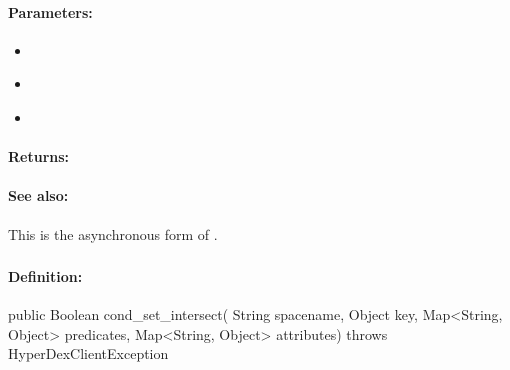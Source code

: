 \paragraph{Parameters:}
\begin{itemize}[noitemsep]
\item {}\\

\item {}\\

\item {}\\

\end{itemize}

\paragraph{Returns:}


\paragraph{See also:}  This is the asynchronous form of .

\pagebreak
\subsubsection{}
\label{api:java:cond_set_intersect}


\paragraph{Definition:}
\begin{javacode}
public Boolean cond_set_intersect(
        String spacename,
        Object key,
        Map<String, Object> predicates,
        Map<String, Object> attributes) throws HyperDexClientException
\end{javacode}

